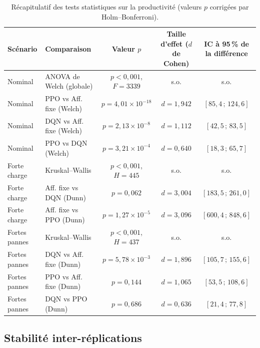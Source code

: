 \documentclass[11pt,a4paper]{article}
\begin{document}
\begin{table}[H]
\centering
\caption{Récapitulatif des tests statistiques sur la productivité (valeurs $p$ corrigées par Holm--Bonferroni).}
\label{tab:stats}
\scriptsize
\setlength{\tabcolsep}{3pt}
\begin{tabular}{llccc}
\toprule
\textbf{Scénario} & \textbf{Comparaison} & \textbf{Valeur $p$} & \textbf{Taille d'effet ($d$ de Cohen)} & \textbf{IC à 95\,\% de la différence} \\
\midrule
Nominal        & ANOVA de Welch (globale)      & $p < 0{,}001$, $F=3339$ & s.o. & s.o. \\
Nominal        & PPO vs Aff. fixe (Welch)  & $p=4{,}01\times10^{-18}$ & $d=1{,}942$ & $[85{,}4\,;\,124{,}6]$ \\
Nominal        & DQN vs Aff. fixe (Welch)  & $p=2{,}13\times10^{-8}$ & $d=1{,}112$ & $[42{,}5\,;\,83{,}5]$ \\
Nominal        & PPO vs DQN (Welch)          & $p=3{,}21\times10^{-4}$ & $d=0{,}640$ & $[18{,}3\,;\,65{,}7]$ \\
Forte charge   & Kruskal--Wallis              & $p < 0{,}001$, $H=445$            & s.o. & s.o. \\
Forte charge   & Aff. fixe vs DQN (Dunn)          & $p = 0{,}062$                     & $d=3{,}004$ & $[183{,}5\,;\,261{,}0]$ \\
Forte charge   & Aff. fixe vs PPO (Dunn)                & $p = 1{,}27\times10^{-5}$         & $d=3{,}096$ & $[600{,}4\,;\,848{,}6]$ \\
Fortes pannes  & Kruskal--Wallis              & $p < 0{,}001$, $H=437$            & s.o. & s.o. \\
Fortes pannes  & DQN vs Aff. fixe (Dunn)                & $p = 5{,}78\times10^{-3}$         & $d=1{,}896$ & $[105{,}7\,;\,155{,}6]$ \\
Fortes pannes  & PPO vs Aff. fixe (Dunn)          & $p = 0{,}144$                     & $d=1{,}065$ & $[53{,}5\,;\,108{,}6]$ \\
Fortes pannes  & DQN vs PPO (Dunn)            & $p = 0{,}686$                     & $d=0{,}636$ & $[21{,}4\,;\,77{,}8]$ \\
\bottomrule
\end{tabular}
\end{table}

\subsection{Stabilité inter-réplications}
\label{sec:stability}
\end{document}
